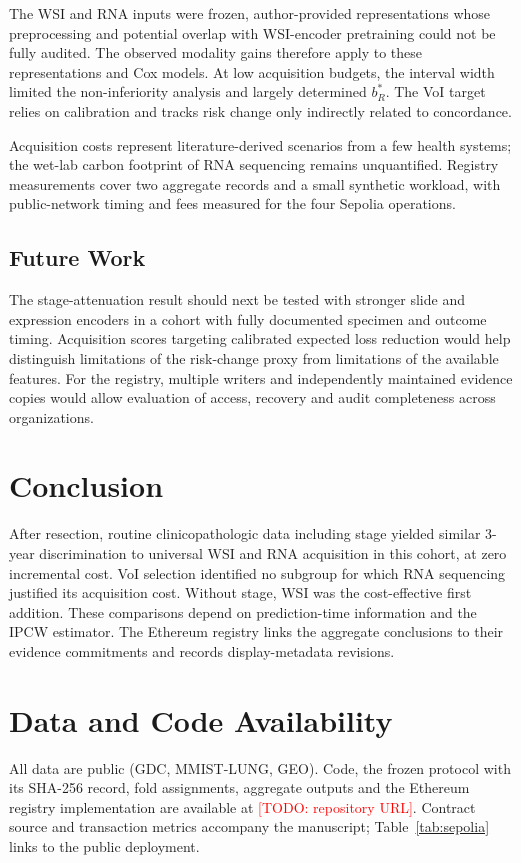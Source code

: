\documentclass[journal,twoside]{IEEEtran}
\newcommand{\todo}[1]{\textcolor{red}{[TODO: #1]}}
\begin{document}
The WSI and RNA inputs were frozen, author-provided representations whose preprocessing and potential overlap with WSI-encoder pretraining could not be fully audited. The observed modality gains therefore apply to these representations and Cox models. At low acquisition budgets, the interval width limited the non-inferiority analysis and largely determined $b_R^*$. The VoI target relies on calibration and tracks risk change only indirectly related to concordance.

Acquisition costs represent literature-derived scenarios from a few health systems; the wet-lab carbon footprint of RNA sequencing remains unquantified. Registry measurements cover two aggregate records and a small synthetic workload, with public-network timing and fees measured for the four Sepolia operations.

\subsection{Future Work}
The stage-attenuation result should next be tested with stronger slide and expression encoders in a cohort with fully documented specimen and outcome timing. Acquisition scores targeting calibrated expected loss reduction would help distinguish limitations of the risk-change proxy from limitations of the available features. For the registry, multiple writers and independently maintained evidence copies would allow evaluation of access, recovery and audit completeness across organizations.

\section{Conclusion}
After resection, routine clinicopathologic data including stage yielded similar 3-year discrimination to universal WSI and RNA acquisition in this cohort, at zero incremental cost. VoI selection identified no subgroup for which RNA sequencing justified its acquisition cost. Without stage, WSI was the cost-effective first addition. These comparisons depend on prediction-time information and the IPCW estimator. The Ethereum registry links the aggregate conclusions to their evidence commitments and records display-metadata revisions.

\section*{Data and Code Availability}
All data are public (GDC, MMIST-LUNG, GEO). Code, the frozen protocol with its SHA-256 record, fold assignments, aggregate outputs and the Ethereum registry implementation are available at \todo{repository URL}. Contract source and transaction metrics accompany the manuscript; Table~\ref{tab:sepolia} links to the public deployment.



\end{document}
